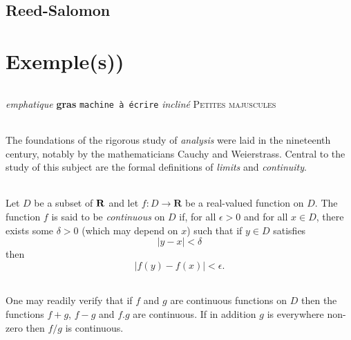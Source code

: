 \documentclass[a4paper,10pt]{report}
\begin{document}
        \chapter{Reed-Salomon}




    \appendix
        \part{Exemple(s))}

            \paragraph{}
                \emph{emphatique}
                \textbf{gras}
                \texttt{machine à écrire}
                \textsl{incliné}
                \textsc{Petites majuscules}

            \paragraph{}
                The foundations of the rigorous study of \emph{analysis}
                were laid in the nineteenth century, notably by the
                mathematicians Cauchy and Weierstrass. Central to the
                study of this subject are the formal definitions of
                \emph{limits} and \emph{continuity}.

            \paragraph{}
                Let $D$ be a subset of $\bf R$ and let
                $f \colon D \to \mathbf{R}$ be a real-valued function on
                $D$. The function $f$ is said to be \emph{continuous} on
                $D$ if, for all $\epsilon > 0$ and for all $x \in D$,
                there exists some $\delta > 0$ (which may depend on $x$)
                such that if $y \in D$ satisfies
                \[ |y - x| < \delta \]
                then
                \[ |f(y) - f(x)| < \epsilon. \]

            \paragraph{}
                One may readily verify that if $f$ and $g$ are continuous
                functions on $D$ then the functions $f+g$, $f-g$ and
                $f.g$ are continuous. If in addition $g$ is everywhere
                non-zero then $f/g$ is continuous.


    \listoffigures
\end{document}
